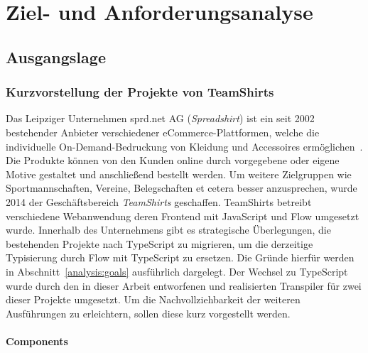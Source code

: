 \chapter{Ziel- und Anforderungsanalyse}
\label{chap:analysis}

\section{Ausgangslage}
\label{sec:status-quo}


\subsection{Kurzvorstellung der Projekte von TeamShirts}

Das Leipziger Unternehmen sprd.net AG (\textit{Spreadshirt}) ist ein seit 2002 bestehender Anbieter verschiedener eCommerce-Plattformen, welche die individuelle On-Demand-Bedruckung von Kleidung und Accessoires ermöglichen~\autocite{SPREADSHIRT:ABOUT}. Die Produkte können von den Kunden online durch vorgegebene oder eigene Motive gestaltet und anschließend bestellt werden. Um weitere Zielgruppen wie Sportmannschaften, Vereine, Belegschaften et cetera besser anzusprechen, wurde 2014 der Geschäftsbereich \textit{TeamShirts} geschaffen.
TeamShirts betreibt verschiedene Webanwendung deren Frontend mit JavaScript und Flow umgesetzt wurde. Innerhalb des Unternehmens gibt es strategische Überlegungen, die bestehenden Projekte nach TypeScript zu migrieren, um die derzeitige Typisierung durch Flow mit TypeScript zu ersetzen. Die Gründe hierfür werden in Abschnitt~\ref{analysis:goals} ausführlich dargelegt. Der Wechsel zu TypeScript wurde durch den in dieser Arbeit entworfenen und realisierten Transpiler für zwei dieser Projekte umgesetzt. Um die Nachvollziehbarkeit der weiteren Ausführungen zu erleichtern, sollen diese kurz vorgestellt werden.

\subsubsection{Components}


